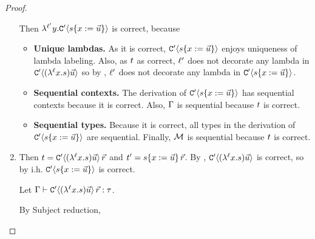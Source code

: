 \begin{proof}
\begin{enumerate}
Then $\lambda^{\ell'} y. \mathtt{C}'\langle s\{x := \vec{u}\}\rangle$ is correct, because
\begin{itemize}
\item {\bf Unique lambdas.}
      As it is correct, $\mathtt{C}'\langle s\{x := \vec{u}\}\rangle$ enjoys uniqueness of lambda labeling.
      Also, as $t$ as correct, $\ell'$ does not decorate any lambda in
        $\mathtt{C}'\langle(\lambda^{\ell} x. s) \vec{u}\rangle$
      so by , $\ell'$ does not decorate any lambda in
        $\mathtt{C}'\langle s\{x := \vec{u}\}\rangle$.
\item {\bf Sequential contexts.}
      The derivation of $\mathtt{C}'\langle s\{x := \vec{u}\}\rangle$ has sequential contexts because
      it is correct.
      Also, $\Gamma$ is sequential because $t$ is correct.
\item {\bf Sequential types.} Because it is correct, all types in the derivation of
          $\mathtt{C}'\langle s\{x := \vec{u}\}\rangle$
      are sequential. Finally, $\mathcal{M}$ is sequential because $t$ is correct.
\end{itemize}
\item {}
  Then $t = \mathtt{C}'\langle(\lambda^{\ell} x. s) \vec{u}\rangle\,\vec{r}$
  and $t' = s\{x := \vec{u}\}\,\vec{r}$.
  By , $\mathtt{C}'\langle(\lambda^{\ell} x. s) \vec{u}\rangle$
    is correct, so by i.h. $\mathtt{C}'\langle s\{x := \vec{u}\}\rangle$ is correct.

  Let
    $\Gamma \vdash \mathtt{C}'\langle(\lambda^{\ell} x. s) \vec{u}\rangle\,\vec{r} : \tau$.

By Subject reduction,


\end{enumerate}
\end{proof}
